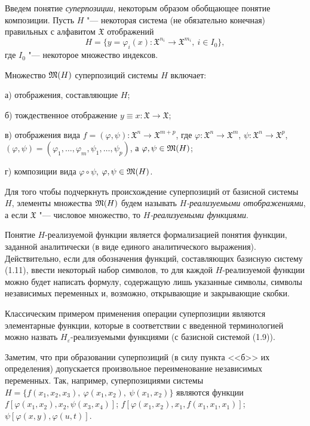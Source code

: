 Введем понятие \emph{суперпозиции}, некоторым образом обобщающее понятие
композиции. Пусть $H$ "--- некоторая система (не обязательно конечная)
правильных с алфавитом $\mathfrak X$ отображений
\begin{equation}\tag{1.11}
H=\{y=\varphi_i(x)\colon\mathfrak X^{n_i}\to\mathfrak X^{m_i},\ i\in I_0\},
\end{equation}
где $I_0$ "--- некоторое множество индексов.

Множество $\mathfrak M(H)$ суперпозиций системы $H$ включает:

а) отображения, составляющие $H$;

б) тождественное отображение $y\equiv x\colon\mathfrak X\to\mathfrak X$;

в) отображения вида
$f=(\varphi,\psi)\colon\mathfrak X^n\to\mathfrak X^{m+p}$, где
$\varphi\colon\mathfrak X^n\to\mathfrak X^m$,
$\psi\colon\mathfrak X^n\to\mathfrak X^p$,
$(\varphi,\psi)=(\varphi_1,\dots,\varphi_m,\psi_1,\dots,\psi_p)$,
а $\varphi,\psi\in\mathfrak M(H)$;

г) композиции вида $\varphi\circ\psi$, $\varphi,\psi\in\mathfrak M(H)$.
%

Для того чтобы подчеркнуть происхождение суперпозиций от базисной системы
$H$, элементы множества $\mathfrak M(H)$ будем называть \emph{$H$-реализуемыми
отображениями}, а если $\mathfrak X$ "--- числовое множество, то
\emph{$H$-реализуемыми функциями}.

Понятие $H$-реализуемой функции является формализацией понятия функции,
заданной аналитически (в виде единого аналитического выражения).
Действительно, если для обозначения функций, составляющих базисную систему
(1.11), ввести некоторый набор символов, то для каждой $H$-реализуемой
функции можно будет написать формулу, содержащую лишь указанные символы,
символы независимых переменных и, возможно, открывающие и закрывающие
скобки.

Классическим примером применения операции суперпозиции являются
элементарные функции, которые в соответствии с введенной терминологией
можно назвать $H_\varepsilon$-реализуемыми функциями (с базисной системой
(1.9)).

Заметим, что при образовании суперпозиций (в силу пункта <<б>> их
определения) допускается произвольное переименование независимых
переменных. Так, например, суперпозициями системы
$H=\{f(x_1,x_2,x_3),\ \varphi(x_1,x_2),\ \psi(x_1,x_2)\}$ являются функции
$f[\varphi(x_1,x_2),x_2,\psi(x_3,x_4)]$;
$f[\varphi(x_1,x_2),x_1,f(x_1,x_1,x_1)]$; $\psi[\varphi(x,y),\varphi(u,t)]$.

